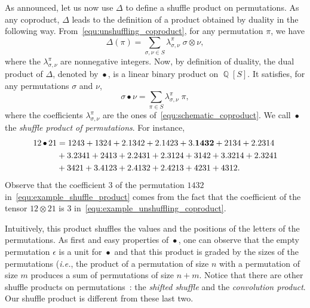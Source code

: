 \documentclass[a4paper]{llncs}
\DeclareMathOperator{\QQ}{\mathbb{Q}}
\DeclareMathOperator{\SHUFFLE}{\bullet}
\begin{document}
As announced, let us now use $\Delta$ to define a shuffle product on
permutations. As any coproduct, $\Delta$ leads to the definition of a
product obtained by duality in the following way.
From~\eqref{equ:unshuffling_coproduct}, for any permutation $\pi$, we
have
\begin{equation} \label{equ:schematic_coproduct}
    \Delta(\pi) =
    \sum_{\sigma, \nu \in S} \lambda_{\sigma, \nu}^\pi \;
    \sigma \otimes \nu,
\end{equation}
where the $\lambda_{\sigma, \nu}^\pi$ are nonnegative integers. Now,
by definition of duality, the dual product of $\Delta$, denoted by
$\SHUFFLE$, is a linear binary product on $\QQ[S]$. It satisfies, for
any permutations $\sigma$ and $\nu$,
\begin{equation}
    \sigma \SHUFFLE \nu =
    \sum_{\pi \in S}
    \lambda_{\sigma, \nu}^\pi \; \pi,
\end{equation}
where the coefficients $\lambda_{\sigma, \nu}^\pi$ are the ones
of~\eqref{equ:schematic_coproduct}. We call $\SHUFFLE$ the
{\em shuffle product of permutations}. For instance,
\begin{equation}\begin{split} \label{equ:example_shuffle_product}
    12 \SHUFFLE 21 & =
    1243 + 1324 + 2.1342 + 2.1423 + 3. {\bf 1432} + 2134 + 2.2314 \\
    & + 3.2341 + 2413 + 2.2431 + 2.3124 + 3142 + 3.3214 + 2.3241 \\
    & + 3421 + 3.4123 + 2.4132 + 2.4213 + 4231 + 4312.
\end{split}\end{equation}
Observe that the coefficient $3$ of the permutation $1432$
in~\eqref{equ:example_shuffle_product} comes from the fact that the
coefficient of the tensor $12 \otimes 21$ is $3$
in~\eqref{equ:example_unshuffling_coproduct}.
\medskip

Intuitively, this product shuffles the values and the positions of the
letters of the permutations. As first and easy properties of $\SHUFFLE$,
one can observe that the empty permutation $\epsilon$ is a unit for
$\SHUFFLE$ and that this product is graded by the sizes of the
permutations ({\em i.e.}, the product of a permutation of size $n$ with
a permutation of size $m$ produces a sum of permutations of size $n + m$.
Notice that there are other shuffle products on
permutations~\cite{DHT:IJAC:2002}: the {\em shifted shuffle} and the
{\em convolution product}. Our shuffle product is different from these
last two.
\medskip
\end{document}
